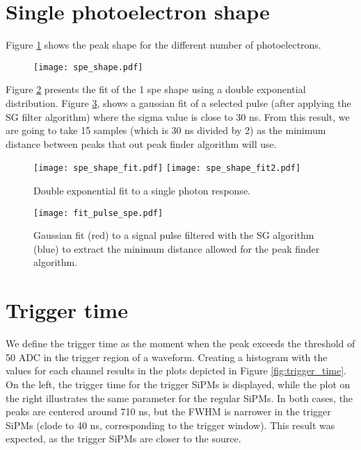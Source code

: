 \documentclass[11pt,a4paper,english,oneside, pdf]{article}
\begin{document}
	
	
	\section{Single photoelectron shape}
	
	Figure \ref{fig:spe_shape} shows the peak shape for the different number of photoelectrons.
	
	\begin{figure}[!h]
		\begin{center}
			\texttt{[image: spe\_shape.pdf]}
			\caption{}
			\label{fig:spe_shape}
		\end{center}
	\end{figure}
	
	Figure \ref{fig:spe_shape_fit} presents the fit of the 1 spe shape using a double exponential distribution. Figure \ref{fig:fit_pulse_spe}, shows a gaussian fit of a selected pulse (after applying the SG filter algorithm) where the sigma value is close to 30 ns. From this result, we are going to take 15 samples (which is 30 ns divided by 2) as the minimum distance between peaks that out peak finder algorithm will use.
	
	\begin{figure}[!h]
		\centering
		\texttt{[image: spe\_shape\_fit.pdf]}
		\texttt{[image: spe\_shape\_fit2.pdf]}
		\caption{Double exponential fit to a single photon response.}
		\label{fig:spe_shape_fit}
	\end{figure}
	
	\begin{figure}[!h]
		\begin{center}
			\texttt{[image: fit\_pulse\_spe.pdf]}
			\caption{Gaussian fit (red) to a signal pulse filtered with the SG algorithm (blue) to extract the minimum distance allowed for the peak finder algorithm.}
			\label{fig:fit_pulse_spe}
		\end{center}
	\end{figure}
	
	\section{Trigger time}
	
	We define the trigger time as the moment when the peak exceeds the threshold of 50 ADC in the trigger region of a waveform. Creating a histogram with the values for each channel results in the plots depicted in Figure \ref{fig:trigger_time}. On the left, the trigger time for the trigger SiPMs is displayed, while the plot on the right illustrates the same parameter for the regular SiPMs. In both cases, the peaks are centered around 710 ns, but the FWHM is narrower in the trigger SiPMs (clode to 40 ns, corresponding to the trigger window). This result was expected, as the trigger SiPMs are closer to the source.
	
\end{document}
